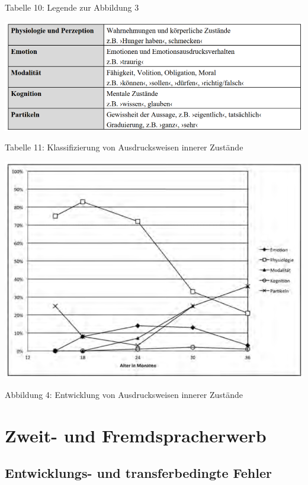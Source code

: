 \documentclass[
  letterpaper,
]{scrbook}
\begin{document}
Tabelle 10: Legende zur Abbildung 3

\includegraphics[width=1\textwidth,height=\textheight]{./pictures/kauschke_tab11.png}

Tabelle 11: Klassifizierung von Ausdrucksweisen innerer Zustände

\includegraphics[width=1\textwidth,height=\textheight]{./pictures/kauschke_abb4.png}

Abbildung 4: Entwicklung von Ausdrucksweisen innerer Zustände

\part{Zweit- und Fremdspracherwerb}

\hypertarget{sec-gender}{%
\chapter{Entwicklungs- und transferbedingte Fehler}\label{sec-gender}}
\end{document}
